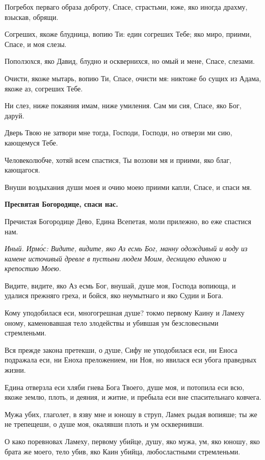 Погребох перваго образа доброту, Спасе, страстьми, юже, яко иногда драхму, взыскав, обрящи.

Согреших, якоже блудница, вопию Ти: един согреших Тебе; яко миро, приими, Спасе, и моя слезы.

Поползохся, яко Давид, блудно и осквернихся, но омый и мене, Спасе, слезами.

Очисти, якоже мытарь, вопию Ти, Спасе, очисти мя: никтоже бо сущих из Адама, якоже аз, согреших Тебе.

Ни слез, ниже покаяния имам, ниже умиления. Сам ми сия, Спасе, яко Бог, даруй.

Дверь Твою не затвори мне тогда, Господи, Господи, но отверзи ми сию, кающемуся Тебе.

Человеколюбче, хотяй всем спастися, Ты воззови мя и приими, яко благ, кающагося.

Внуши воздыхания души моея и очию моею приими капли, Спасе, и спаси мя.

\bfseries Пресвятая Богородице, спаси нас.

\normalfont{}

Пречистая Богородице Дево, Едина Всепетая, моли прилежно, во еже спастися нам.

\itshape Иный. Ирм\'{о}с\normalfont{}: Видите, видите, яко Аз есмь Бог, манну одождивый и воду из камене источивый древле в пустыни людем Моим, десницею единою и крепостию Моею.

Видите, видите, яко Аз есмь Бог, внушай, душе моя, Господа вопиюща, и удалися прежняго греха, и бойся, яко неумытнаго и яко Судии и Бога.

Кому уподобилася еси, многогрешная душе? токмо первому Каину и Ламеху оному, каменовавшая тело злодействы и убившая ум безсловесными стремленьми.

Вся прежде закона претекши, о душе, Сифу не уподобилася еси, ни Еноса подражала еси, ни Еноха преложением, ни Ноя, но явилася еси убога праведных жизни.

Едина отверзла еси хляби гнева Бога Твоего, душе моя, и потопила еси всю, якоже землю, плоть, и деяния, и житие, и пребыла еси вне спасительнаго ковчега.

Мужа убих, глаголет, в язву мне и юношу в струп, Ламех рыдая вопияше; ты же не трепещеши, о душе моя, окалявши плоть и ум осквернивши.

О како поревновах Ламеху, первому убийце, душу, яко мужа, ум, яко юношу, яко брата же моего, тело убив, яко Каин убийца, любосластными стремленьми.

